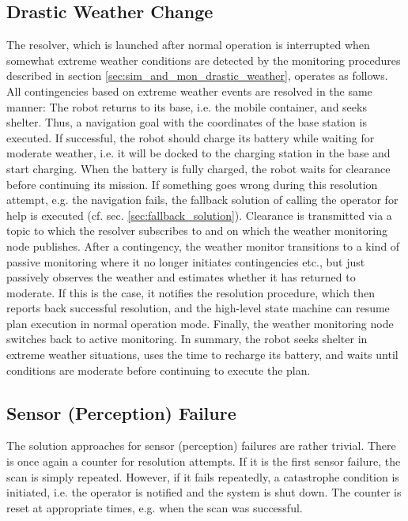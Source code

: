 \documentclass[english, master, utf8]{base/thesis_KBS}
\newcommand{\code}{\collectverb{\codebox}}
\begin{document}
\subsection{Drastic Weather Change}
\label{sec:weather_resolver}

The resolver, which is launched after normal operation is interrupted when somewhat extreme weather conditions are detected by the monitoring procedures described in section
\ref{sec:sim_and_mon_drastic_weather}, operates as follows. All contingencies based on extreme weather events are resolved in the same manner: The robot returns to its base,
i.e. the mobile container, and seeks shelter. Thus, a \code{move_base_flex} navigation goal with the coordinates of the base station is executed. If successful, the robot
should charge its battery while waiting for moderate weather, i.e. it will be docked to the charging station in the base and start charging. When the battery is fully charged,
the robot waits for clearance before continuing its mission. If something goes wrong during this resolution attempt, e.g. the \code{move_base_flex} navigation fails, the
fallback solution of calling the operator for help is executed (cf. sec. \ref{sec:fallback_solution}). Clearance is transmitted via a topic \code{/moderate_weather} to which the
resolver subscribes to and on which the weather monitoring node publishes. After a contingency, the weather monitor transitions to a kind of passive monitoring where it no longer
initiates contingencies etc., but just passively observes the weather and estimates whether it has returned to moderate. If this is the case, it notifies the resolution procedure,
which then reports back successful resolution, and the high-level state machine can resume plan execution in normal operation mode. Finally, the weather monitoring node switches
back to active monitoring. In summary, the robot seeks shelter in extreme weather situations, uses the time to recharge its battery, and waits until conditions are moderate before
continuing to execute the plan.

\subsection{Sensor (Perception) Failure}
\label{sec:sensor_failure_resolver}

The solution approaches for sensor (perception) failures are rather trivial. There is once again a counter for resolution attempts. If it is the first sensor failure, the scan is
simply repeated. However, if it fails repeatedly, a catastrophe condition is initiated, i.e. the operator is notified and the system is shut down. The counter is reset at appropriate
times, e.g. when the scan was successful.
\end{document}
